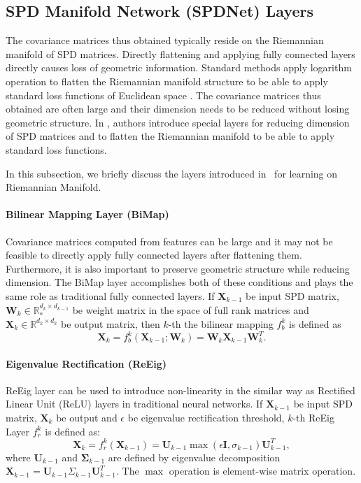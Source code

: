 \documentclass[10pt,twocolumn,letterpaper]{article}
\begin{document}
		
		
		\subsection{SPD Manifold Network (SPDNet) Layers}
		The covariance matrices thus obtained typically reside on the Riemannian manifold of SPD matrices. Directly flattening and applying fully connected layers directly causes loss of geometric information. Standard methods apply logarithm operation to flatten the Riemannian manifold structure to be able to apply standard loss functions of Euclidean space \cite{semanticsegmentation}\cite{cdu}. The covariance matrices thus obtained are often large and their dimension needs to be reduced without losing geometric structure. In \cite{spdnet}, authors introduce special layers for reducing dimension of SPD matrices and to flatten the Riemannian manifold to be able to apply standard loss functions.

		In this subsection, we briefly discuss the layers introduced in~\cite{spdnet} for learning on Riemannian Manifold.
		\paragraph{Bilinear Mapping Layer (BiMap)} 
		Covariance matrices computed from features can be large and it may not be feasible to directly apply fully connected layers after flattening them. Furthermore, it is also important to preserve geometric structure while reducing dimension. The BiMap layer accomplishes both of these conditions and plays the same role as traditional fully connected layers. If $\mathbf{X}_{k-1}$ be input SPD matrix, $\mathbf{W}_k\in \mathbb{R}_{*}^{d_k\times d_{k-1}}$ be weight matrix in the space of full rank matrices and $\mathbf{X}_k\in\mathbb{R}^{d_k\times d_k}$  be output matrix, then $k$-th the bilinear mapping $f_b^k$ is defined as 
		\begin{equation}
		    \mathbf{X}_k=f_b^{k}(\mathbf{X}_{k-1};\mathbf{W}_k)=\mathbf{W}_k\mathbf{X}_{k-1}\mathbf{W}_k^T.
		\end{equation}
		
		\paragraph{Eigenvalue Rectification (ReEig)}
		ReEig layer can be used to introduce non-linearity in the similar way as Rectified Linear Unit (ReLU) layers in traditional neural networks. If $\mathbf{X}_{k-1}$ be input SPD matrix, $\mathbf{X}_{k}$ be output and $\epsilon$ be eigenvalue rectification threshold, $k$-th ReEig Layer $f_r^{k}$ is defined as:
		\begin{equation}
		    \mathbf{X}_k=f_r^{k}(\mathbf{X}_{k-1})=\mathbf{U}_{k-1}\max(\epsilon\mathbf{I},\sigma_{k-1})\mathbf{U}_{k-1}^T,
		\end{equation}
		where $\mathbf{U}_{k-1}$ and $\mathbf{\Sigma}_{k-1}$ are defined by eigenvalue decomposition $\mathbf{X}_{k-1}=\mathbf{U}_{k-1}\Sigma_{k-1}\mathbf{U}_{k-1}^T$. The $\max$ operation is element-wise matrix operation.
		
\end{document}
